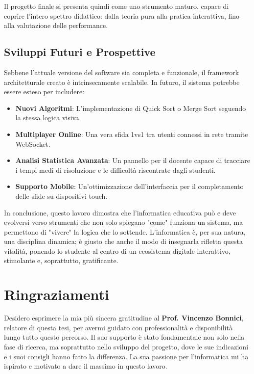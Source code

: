 \documentclass[openany]{theme/uniprthesis}
\begin{document}
Il progetto finale si presenta quindi come uno strumento maturo, capace di coprire l'intero spettro didattico: dalla teoria pura alla pratica interattiva, fino alla valutazione delle performance.

\section*{Sviluppi Futuri e Prospettive}
Sebbene l'attuale versione del software sia completa e funzionale, il framework architetturale creato è intrinsecamente scalabile. In futuro, il sistema potrebbe essere esteso per includere:
\begin{itemize}
    \item \textbf{Nuovi Algoritmi}: L'implementazione di Quick Sort o Merge Sort seguendo la stessa logica visiva.
    \item \textbf{Multiplayer Online}: Una vera sfida 1vs1 tra utenti connessi in rete tramite WebSocket.
    \item \textbf{Analisi Statistica Avanzata}: Un pannello per il docente capace di tracciare i tempi medi di risoluzione e le difficoltà riscontrate dagli studenti.
    \item \textbf{Supporto Mobile}: Un'ottimizzazione dell'interfaccia per il completamento delle sfide su dispositivi touch.
\end{itemize}

In conclusione, questo lavoro dimostra che l'informatica educativa può e deve evolversi verso strumenti che non solo spiegano "come" funziona un sistema, ma permettono di "vivere" la logica che lo sottende. L'informatica è, per sua natura, una disciplina dinamica; è giusto che anche il modo di insegnarla rifletta questa vitalità, ponendo lo studente al centro di un ecosistema digitale interattivo, stimolante e, soprattutto, gratificante.


\nocite{*}
\clearpage
{}
{}
\renewcommand{\bibname}{Bibliografia}


\clearpage
\chapter*{Ringraziamenti}

Desidero esprimere la mia più sincera gratitudine al \textbf{Prof. Vincenzo Bonnici}, relatore di questa tesi, per avermi guidato con professionalità e disponibilità lungo tutto questo percorso. Il suo supporto è stato fondamentale non solo nella fase di ricerca, ma soprattutto nello sviluppo del progetto, dove le sue indicazioni e i suoi consigli hanno fatto la differenza. La sua passione per l'informatica mi ha ispirato e motivato a dare il massimo in questo lavoro.
\end{document}
